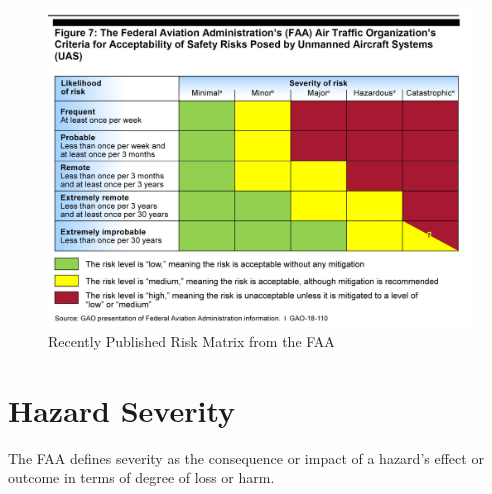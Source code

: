 \documentclass[
]{book}
\begin{document}
\begin{figure}

{\centering \includegraphics[width=0.8\linewidth]{images/Risk_Matrix} 

}

\caption{Recently Published Risk Matrix from the FAA}\label{fig:risk-matrix}
\end{figure}

\hypertarget{hazard-severity}{%
\section{Hazard Severity}\label{hazard-severity}}

The FAA defines severity as the consequence or impact of a hazard's effect or outcome in terms of degree of loss or harm.
\end{document}
